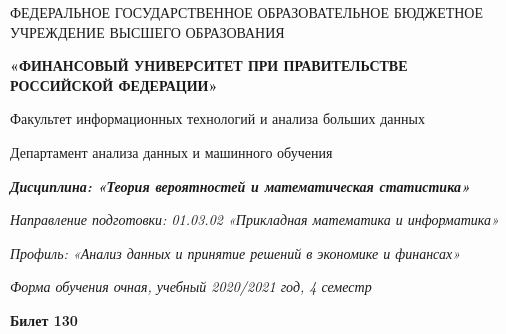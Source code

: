 \documentclass[a4paper,10pt]{article}
\begin{document}
\begin{center}
ФЕДЕРАЛЬНОЕ ГОСУДАРСТВЕННОЕ ОБРАЗОВАТЕЛЬНОЕ БЮДЖЕТНОЕ УЧРЕЖДЕНИЕ ВЫСШЕГО ОБРАЗОВАНИЯ

    \textbf{«ФИНАНСОВЫЙ УНИВЕРСИТЕТ ПРИ ПРАВИТЕЛЬСТВЕ РОССИЙСКОЙ ФЕДЕРАЦИИ»}

Факультет информационных технологий и анализа больших данных

Департамент анализа данных и машинного обучения

\textit{
	\textbf{Дисциплина: «Теория вероятностей и математическая статистика»}}

\textit{Направление подготовки: 01.03.02 «Прикладная математика и информатика»}

\textit{Профиль: «Анализ данных и принятие решений в экономике и финансах»}

\textit{Форма обучения очная, учебный 2020/2021 год, 4 семестр}

\textbf{Билет 130}

\end{center}
\end{document}

